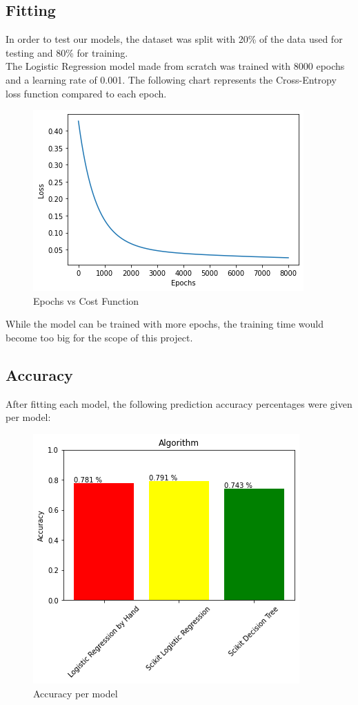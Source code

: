\documentclass[letterpaper, 10 pt, conference]{ieeeconf}
\begin{document}
\subsection{ Fitting }
In order to test our models, the dataset was split with 20\% of the data used for testing and 80\% for training. \\

The Logistic Regression model made from scratch was trained with 8000 epochs and a learning rate of 0.001. The following chart represents the
Cross-Entropy loss function compared to each epoch.

\begin{figure}[thpb]
    \centering
    \includegraphics[scale=0.6]{figures/epochs.png}
    \caption{Epochs vs Cost Function}
    \label{epochs}
 \end{figure}


While the model can be trained with more epochs, the training time would become too big for the scope of this project. \\

\subsection{Accuracy}
After fitting each model, the following prediction accuracy percentages were given per model:
\begin{figure}[thpb]
    \centering
    \includegraphics[scale=0.5]{figures/accuracy.png}
    \caption{Accuracy per model}
    \label{accuracy}
 \end{figure}
\end{document}

